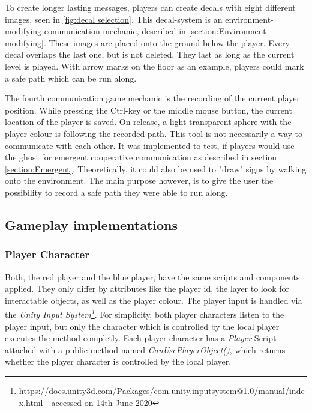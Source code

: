 To create longer lasting messages, players can create decals with eight different images, seen in \ref{fig:decal selection}. This decal-system is an environment-modifying communication mechanic, described in \ref{section:Environment-modifying}. These images are placed onto the ground below the player. Every decal overlaps the last one, but is not deleted. They last as long as the current level is played. With arrow marks on the floor as an example, players could mark a safe path which can be run along.


The fourth communication game mechanic is the recording of the current player position. While pressing the Ctrl-key or the middle mouse button, the current location of the player is saved. On release, a light transparent sphere with the player-colour is following the recorded path. This tool is not necessarily a way to communicate with each other. It was implemented to test, if players would use the ghost for emergent cooperative communication as described in section \ref{section:Emergent}. Theoretically, it could also be used to "draw" signs by walking onto the environment. The main purpose however, is to give the user the possibility to record a safe path they were able to run along.



\subsection{Gameplay implementations}
\label{section:Gameplay implementations}


\subsubsection{Player Character}

Both, the red player and the blue player, have the same scripts and components applied. They only differ by attributes like the player id, the layer to look for interactable objects, as well as the player colour.
The player input is handled via the \textit{Unity Input System\footnote{\url{https://docs.unity3d.com/Packages/com.unity.inputsystem@1.0/manual/index.html} - accessed on 14th June 2020}}. For simplicity, both player characters listen to the player input, but only the character which is controlled by the local player executes the method completly.
Each player character has a \textit{Player}-Script attached with a public method named \textit{CanUsePlayerObject()}, which returns whether the player character is controlled by the local player.

